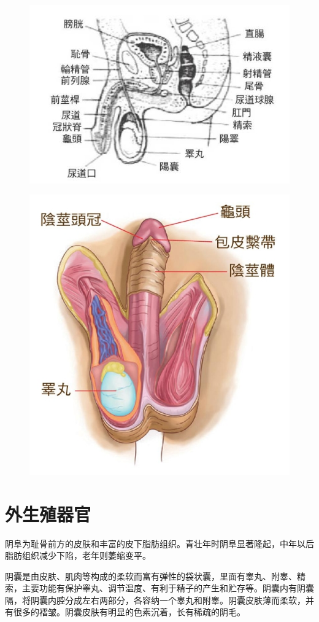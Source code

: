 \documentclass[12pt,UTF8]{ctexbook}
\begin{document}
\begin{figure}[htbp]
	\centering
	\includegraphics[width=0.7\linewidth]{4}
	\caption{}
\end{figure}

\begin{figure}[htbp]
	\centering
	\includegraphics[width=0.7\linewidth]{13}
	\caption{}
\end{figure}

\section{外生殖器官}

阴阜为耻骨前方的皮肤和丰富的皮下脂肪组织。青壮年时阴阜显著隆起，中年以后脂肪组织减少下陷，老年则萎缩变平。

阴囊是由皮肤、肌肉等构成的柔软而富有弹性的袋状囊，里面有睾丸、附睾、精索，主要功能有保护睾丸、调节温度、有利于精子的产生和贮存等。阴囊内有阴囊隔，将阴囊内腔分成左右两部分，各容纳一个睾丸和附睾。阴囊皮肤薄而柔软，并有很多的褶皱。阴囊皮肤有明显的色素沉着，长有稀疏的阴毛。
\end{document}
